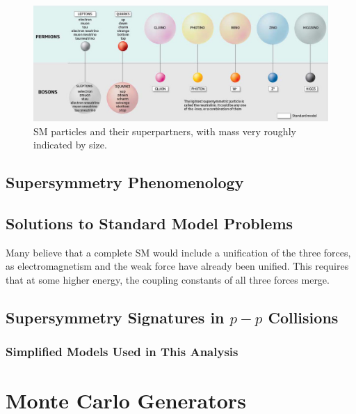 \begin{centering}
\begin{figure}[!hbt]
\myfloatalign
\includegraphics[width=.9\linewidth]{figures/theory/27341202.jpg}
\caption{\ac{SM} particles and their superpartners, with mass very roughly indicated by size. \cite{newscientist-pz}}
\label{fig:sparticles}
\end{figure}
\end{centering}



\subsection{Supersymmetry Phenomenology}

\cite{Martin:1997ns}

\subsection{Solutions to Standard Model Problems}


Many believe that a complete \ac{SM} would include a unification of the three forces, as electromagnetism and the weak force have already been unified. This requires that at some higher energy, the coupling constants of all three forces merge. 

\subsection{Supersymmetry Signatures in $p-p$ Collisions}
\subsubsection{Simplified Models Used in This Analysis}
\label{sec:simplified_models}

\section{Monte Carlo Generators}
\label{sec:MC_gen}